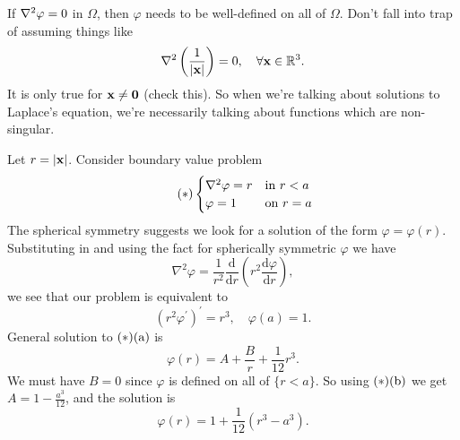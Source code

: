 \begin{remark}
    If $ \laplacian \varphi=0 $ in $ \Omega $, then $ \varphi $ needs to be well-defined on all of $ \Omega $. Don't fall into trap of assuming things like
    \[
        \laplacian\left( \frac{1}{|\bfx|} \right)=0,\quad \forall \bfx\in \mathbb{R}^{3}.
    \]
    It is only true for ${\bf x}\neq \mathbf{0}$ (check this). So when we’re talking about solutions to Laplace’s equation, we’re necessarily talking about functions which are non-singular. 
\end{remark}

\begin{example}
    Let $ r=|{\bf x}| $. Consider boundary value problem 
    \[\tag{$*$}
        \begin{cases}
        \laplacian \varphi=r &\text{in }r<a\\
        \varphi=1 &\text{on }r=a\\
        \end{cases} 
    \]
    The spherical symmetry suggests we look for a solution of the form $ \varphi=\varphi(r) $. Substituting in and using the fact for spherically symmetric $ \varphi $ we have 
    \[
        \nabla^{2} \varphi=\frac{1}{r^{2}} \frac{\mathrm{d}}{\mathrm{d} r}\left(r^{2} \frac{\mathrm{d} \varphi}{\mathrm{d} r}\right),
    \]
    we see that our problem is equivalent to
    \[
        \left(r^{2} \varphi^{\prime}\right)^{\prime}=r^{3}, \quad \varphi(a)=1.
    \]
    General solution to $(*)(\mathrm{a})$ is 
    \[
        \varphi(r)=A+\frac{B}{r}+\frac{1}{12}r^3.
    \]
    We must have $B=0$ since $ \varphi $ is defined on all of $ \{r<a\} $. So using $ (*)(\mathrm{b}) $ we get $ A=1-\frac{a^3}{12} $, and the solution is 
    \[
        \varphi(r) = 1+\frac{1}{12}(r^3-a^3).
    \]
\end{example}

